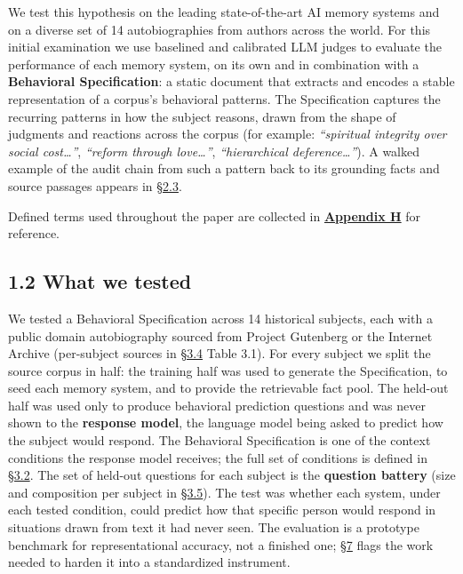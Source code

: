 We test this hypothesis on the leading state-of-the-art AI memory
systems and on a diverse set of 14 autobiographies from authors across
the world. For this initial examination we use baselined and calibrated
LLM judges to evaluate the performance of each memory system, on its own
and in combination with a \textbf{Behavioral Specification}: a static
document that extracts and encodes a stable representation of a corpus's
behavioral patterns. The Specification captures the recurring patterns
in how the subject reasons, drawn from the shape of judgments and
reactions across the corpus (for example: \emph{``spiritual integrity
over social cost\ldots{}''}, \emph{``reform through love\ldots{}''},
\emph{``hierarchical deference\ldots{}''}). A walked example of the
audit chain from such a pattern back to its grounding facts and source
passages appears in \hyperref[traceability-and-reasoning-traces]{§2.3}.

Defined terms used throughout the paper are collected in
\protect\hyperlink{appendix-h.-glossary}{\textbf{Appendix H}} for
reference.

\hypertarget{what-we-tested}{%
\subsection{1.2 What we tested}\label{what-we-tested}}

We tested a Behavioral Specification across 14 historical subjects, each
with a public domain autobiography sourced from Project Gutenberg or the
Internet Archive (per-subject sources in \hyperref[subjects]{§3.4} Table 3.1). For every
subject we split the source corpus in half: the training half was used
to generate the Specification, to seed each memory system, and to
provide the retrievable fact pool. The held-out half was used only to
produce behavioral prediction questions and was never shown to the
\textbf{response model}, the language model being asked to predict how
the subject would respond. The Behavioral Specification is one of the
context conditions the response model receives; the full set of
conditions is defined in \hyperref[experimental-conditions]{§3.2}. The set of held-out questions for each
subject is the \textbf{question battery} (size and composition per
subject in \hyperref[question-battery-formation]{§3.5}). The test was whether each system, under each tested
condition, could predict how that specific person would respond in
situations drawn from text it had never seen. The evaluation is a
prototype benchmark for representational accuracy, not a finished one;
\hyperref[future-work]{§7} flags the work needed to harden it into a standardized instrument.

